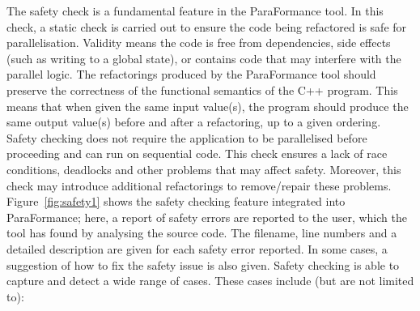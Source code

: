 The safety check is a fundamental feature in the ParaFormance tool. In this check, a static check is carried out to ensure the code being refactored is safe for parallelisation. Validity means the code is free from dependencies, side effects (such as writing to a global state), or contains code that may interfere with the parallel logic.
%
The refactorings produced by the ParaFormance tool should preserve the correctness of the functional semantics of the C++ program. This means that when given the same input value(s), the program should produce the same output value(s) before and after a refactoring, up to a given ordering.
%
Safety checking does not require the application to be parallelised before proceeding and can run on sequential code. This check ensures a lack of race conditions, deadlocks and other problems that may affect safety. Moreover, this check may introduce additional refactorings to remove/repair these problems. 
%
Figure~\ref{fig:safety1} shows the safety checking feature integrated into ParaFormance; here, a report of safety errors are reported to the user, which the tool has found by analysing the source code. The filename, line numbers and a detailed description are given for each safety error reported. In some cases, a suggestion of how to fix the safety issue is also given. Safety checking is able to capture and detect a wide range of cases. These cases include (but are not limited to):

